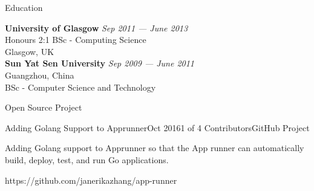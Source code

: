 \documentclass{res4} %
\begin{document}

\begin{rSection}{Education}

{\bf University of Glasgow} \hfill {\em Sep 2011 --- June 2013} \\ 
 Honours 2:1 BSc - Computing Science\\
Glasgow, UK\\

{\bf Sun Yat Sen University} \hfill {\em Sep 2009 --- June 2011} \\ 
Guangzhou, China \\
BSc - Computer Science and Technology\\
\end{rSection}

\begin{rSection}{Open Source Project}

\begin{rSubsection}{Adding Golang Support to Apprunner}{Oct 2016}{1 of 4 Contributors}{GitHub Project}
\item Adding Golang support to Apprunner so that the App runner can automatically build, deploy, test, and run Go applications.
\item https://github.com/janerikazhang/app-runner
\end{rSubsection}
\end{rSection}
\end{document}
